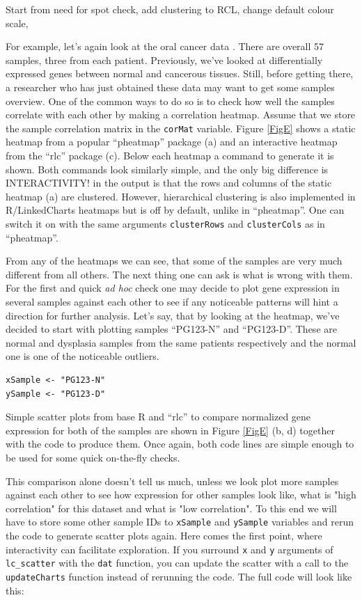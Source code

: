 \documentclass[twocolumn,10pt]{article}
\begin{document}
Start from need for spot check, add clustering to RCL, change default colour scale,


For example, let's again look at the oral cancer data \citep{conway_2015}. There are overall 57 samples, three from each patient. Previously, we've looked at differentially expressed genes between normal and cancerous tissues. Still, before getting there, a researcher who has just obtained these data may want to get some samples overview. One of the common ways to do so is to check how well the samples correlate with each other by making a correlation heatmap. Assume that we store the sample correlation matrix in the \texttt{corMat} variable. Figure \ref{FigE} shows a static heatmap from a popular ``pheatmap'' \citep{kolde_2019} package (a) and an interactive heatmap from  the ``rlc'' package (c). Below each heatmap a command to generate it is shown. Both commands look similarly simple, and the only big difference is INTERACTIVITY! in the output is that the rows and columns of the static heatmap (a) are clustered. However, hierarchical clustering is also implemented in R/LinkedCharts heatmaps but is off by default, unlike in ``pheatmap''. One can switch it on with the same arguments \texttt{clusterRows} and \texttt{clusterCols} as in ``pheatmap''.

From any of the heatmaps we can see, that some of the samples are very much different from all others. The next thing one can ask is what is wrong with them. For the first and quick \emph{ad hoc} check one may decide to plot gene expression in several samples against each other to see if any noticeable patterns will hint a direction for further analysis. Let's say, that by looking at the heatmap, we've decided to start with plotting samples ``PG123-N'' and ``PG123-D''. These are normal and dysplasia samples from the same patients respectively and the normal one is one of the noticeable outliers.

\begin{verbatim}
xSample <- "PG123-N"
ySample <- "PG123-D"
\end{verbatim}

Simple scatter plots from base R and ``rlc'' to compare normalized gene expression for both of the samples are shown in Figure \ref{FigE} (b, d) together with the code to produce them. Once again, both code lines are simple enough to be used for some quick on-the-fly checks.

This comparison alone doesn't tell us much, unless we look plot more samples against each other to see how expression for other samples look like, what is "high correlation" for this dataset and what is "low correlation". To this end we will have to store some other sample IDs to \texttt{xSample} and \texttt{ySample} variables and rerun the code to generate scatter plots again. Here comes the first point, where interactivity can facilitate exploration. If you surround \texttt{x} and \texttt{y} arguments of \texttt{lc_scatter} with the \texttt{dat} function, you can update the scatter with a call to the \texttt{updateCharts} function instead of rerunning the code. The full code will look like this:
\end{document}
